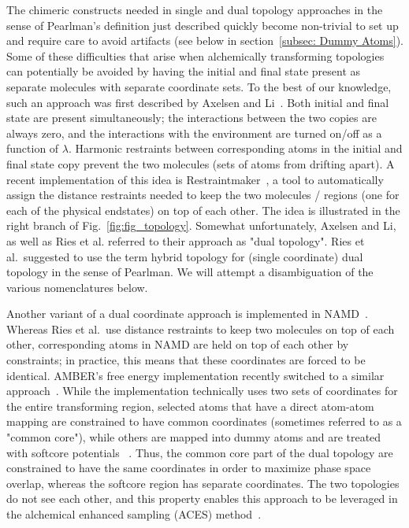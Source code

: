 \documentclass[9pt,bestpractices]{livecoms}
\begin{document}
The chimeric constructs needed in single and dual topology approaches in the sense of Pearlman’s definition just described quickly become non-trivial to set up and require care to avoid artifacts (see below in section~\ref{subsec: Dummy Atoms}). 
Some of these difficulties that arise when alchemically transforming topologies can potentially be avoided by having the initial and final state present as separate molecules with separate coordinate sets. To the best of our knowledge, such an approach was first described by Axelsen and Li~\cite{Axelsen_1998}. Both initial and final state are present simultaneously; the interactions between the two copies are always zero,  and the interactions with the environment are turned on/off as a function of $\lambda$. Harmonic restraints between corresponding atoms in the initial and final state copy prevent the two molecules (sets of atoms from drifting apart). %
A recent implementation of this idea is Restraintmaker~\cite{Ries_2022}, a tool to automatically assign the distance restraints needed to keep the two molecules / regions (one for each of the physical endstates) on top of each other. The idea is illustrated in the right branch of Fig.~\ref{fig:fig_topology}.  Somewhat unfortunately, Axelsen and Li, as well as Ries et al. referred to their approach as "dual topology". Ries et al.~suggested to use the term hybrid topology for (single coordinate) dual topology in the sense of Pearlman. We will attempt a disambiguation of the various nomenclatures below.

Another variant of a dual coordinate approach is implemented in NAMD~\cite{jiang2019computing}. Whereas Ries et al.~use distance restraints to keep two molecules on top of each other, corresponding atoms in NAMD are held on top of each other by constraints; in practice, this means that these coordinates are forced to be identical. AMBER's free energy implementation recently switched to a similar approach~\cite{lee2023aces,York_ACSPhysChemAu_2023_v3_p478}.
While the implementation technically uses two sets of coordinates for the entire transforming region, selected atoms that have a direct atom-atom mapping are constrained to have common coordinates (sometimes referred to as a "common core"), while others are mapped into dummy atoms and are treated with softcore potentials~\cite{Lee_JChemTheoryComput_2020_v16_p5512,tsai2023amber} .  Thus, the common core part of the dual topology are constrained to have the same coordinates in order to maximize phase space overlap, whereas the softcore region has separate coordinates.  The two topologies do not see each other, and this property enables this approach to be leveraged in the alchemical enhanced sampling (ACES) method~\cite{lee2023aces,tsai_jcheminfmodel_2024_v64_p7046,zhang_jchemtheorycomput_2024_v20_p3935}.
\end{document}
